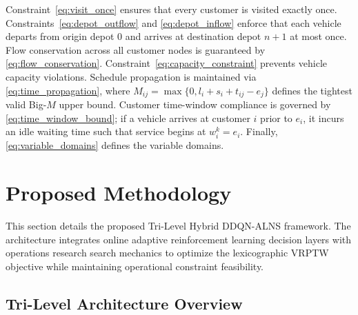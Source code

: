 \documentclass{ieeeaccess}
\begin{document}
Constraint~\eqref{eq:visit_once} ensures that every customer is visited exactly once. Constraints~\eqref{eq:depot_outflow} and \eqref{eq:depot_inflow} enforce that each vehicle departs from origin depot $0$ and arrives at destination depot $n+1$ at most once. Flow conservation across all customer nodes is guaranteed by \eqref{eq:flow_conservation}. Constraint~\eqref{eq:capacity_constraint} prevents vehicle capacity violations. Schedule propagation is maintained via \eqref{eq:time_propagation}, where $M_{ij} = \max\{0, l_i + s_i + t_{ij} - e_j\}$ defines the tightest valid Big-$M$ upper bound. Customer time-window compliance is governed by \eqref{eq:time_window_bound}; if a vehicle arrives at customer $i$ prior to $e_i$, it incurs an idle waiting time such that service begins at $w_i^k = e_i$. Finally, \eqref{eq:variable_domains} defines the variable domains.

\section{Proposed Methodology}
\label{sec:methodology}

This section details the proposed Tri-Level Hybrid DDQN-ALNS framework. The architecture integrates online adaptive reinforcement learning decision layers with operations research search mechanics to optimize the lexicographic VRPTW objective while maintaining operational constraint feasibility.

\subsection{Tri-Level Architecture Overview}
\label{sec:arch_overview}
\end{document}
